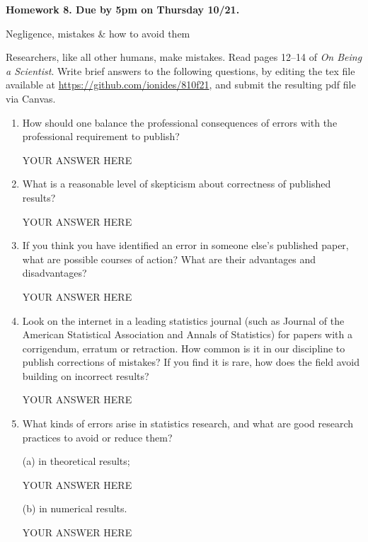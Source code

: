 \documentclass[12pt]{article}
\begin{document}
\begin{center}\bf
Homework 8. Due by 5pm on Thursday 10/21.

Negligence, mistakes \& how to avoid them

\end{center}
Researchers, like all other humans, make mistakes. Read pages 12--14 of {\em On Being a Scientist}.  Write brief answers to the following questions, by editing the tex file available at \url{https://github.com/ionides/810f21}, and submit the resulting pdf file via Canvas.

\begin{enumerate}

\item How should one balance the professional consequences of errors with the professional requirement to publish?
  
YOUR ANSWER HERE

\item What is a reasonable level of skepticism about correctness of published results?

YOUR ANSWER HERE
  
\item If you think you have identified an error in someone else's published paper, what are possible courses of action? What are their advantages and disadvantages?

YOUR ANSWER HERE

\item Look on the internet in a leading statistics journal (such as Journal of the American Statistical Association and Annals of Statistics) for papers with a corrigendum, erratum or retraction. How common is it in our discipline to publish corrections of mistakes? If you find it is rare, how does the field avoid building on incorrect results?

YOUR ANSWER HERE

\item What kinds of errors arise in statistics research, and what are good research practices to avoid or reduce them?

(a) in theoretical results;

YOUR ANSWER HERE
    
(b) in numerical results.

YOUR ANSWER HERE
    
\end{enumerate}
\end{document}
